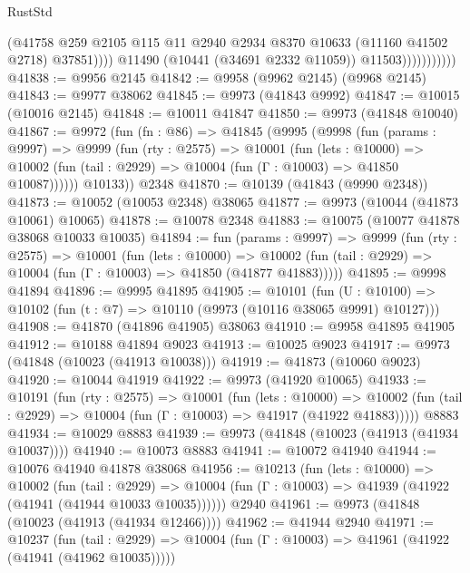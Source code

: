 \begin{lexlean}{RustStd}
\begin{coremodule}
                                (@41758
                                  @259
                                  @2105
                                  @115
                                  @11
                                  @2940
                                  @2934
                                  @8370
                                  @10633
                                  (@11160 @41502 @2718)
                                  @37851))))
                          @11490
                          (@10441 (@34691 @2332 @11059))
                          @11503)))))))))))
@41838 := @9956 @2145
@41842 := @9958 (@9962 @2145) (@9968 @2145)
@41843 := @9977 @38062
@41845 := @9973 (@41843 @9992)
@41847 := @10015 (@10016 @2145)
@41848 := @10011 @41847
@41850 := @9973 (@41848 @10040)
@41867 := @9972
    (fun (fn : @86) =>
    @41845
      (@9995
        (@9998
          (fun (params : @9997) =>
          @9999
            (fun (rty : @2575) =>
            @10001
              (fun (lets : @10000) =>
              @10002 (fun (tail : @2929) => @10004 (fun (Γ : @10003) => @41850 @10087))))))
        @10133))
    @2348
@41870 := @10139 (@41843 (@9990 @2348))
@41873 := @10052 (@10053 @2348) @38065
@41877 := @9973 (@10044 (@41873 @10061) @10065)
@41878 := @10078 @2348
@41883 := @10075 (@10077 @41878 @38068 @10033 @10035)
@41894 := fun (params : @9997) =>
  @9999
    (fun (rty : @2575) =>
    @10001
      (fun (lets : @10000) =>
      @10002 (fun (tail : @2929) => @10004 (fun (Γ : @10003) => @41850 (@41877 @41883)))))
@41895 := @9998 @41894
@41896 := @9995 @41895
@41905 := @10101
    (fun (U : @10100) => @10102 (fun (t : @7) => @10110 (@9973 (@10116 @38065 @9991) @10127)))
@41908 := @41870 (@41896 @41905) @38063
@41910 := @9958 @41895 @41905
@41912 := @10188 @41894 @9023
@41913 := @10025 @9023
@41917 := @9973 (@41848 (@10023 (@41913 @10038)))
@41919 := @41873 (@10060 @9023)
@41920 := @10044 @41919
@41922 := @9973 (@41920 @10065)
@41933 := @10191
    (fun (rty : @2575) =>
    @10001
      (fun (lets : @10000) =>
      @10002 (fun (tail : @2929) => @10004 (fun (Γ : @10003) => @41917 (@41922 @41883)))))
    @8883
@41934 := @10029 @8883
@41939 := @9973 (@41848 (@10023 (@41913 (@41934 @10037))))
@41940 := @10073 @8883
@41941 := @10072 @41940
@41944 := @10076 @41940 @41878 @38068
@41956 := @10213
    (fun (lets : @10000) =>
    @10002
      (fun (tail : @2929) =>
      @10004 (fun (Γ : @10003) => @41939 (@41922 (@41941 (@41944 @10033 @10035))))))
    @2940
@41961 := @9973 (@41848 (@10023 (@41913 (@41934 @12466))))
@41962 := @41944 @2940
@41971 := @10237
    (fun (tail : @2929) => @10004 (fun (Γ : @10003) => @41961 (@41922 (@41941 (@41962 @10035)))))

\end{coremodule}
\end{lexlean}
